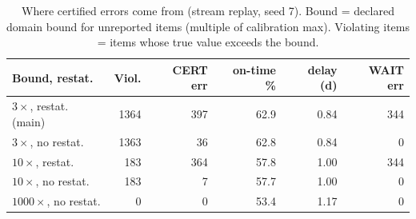 \begin{table}[t]\centering\caption{Where certified errors come from (stream replay, seed 7). Bound = declared domain bound for unreported items (multiple of calibration max). Violating items = items whose true value exceeds the bound.}\label{tab:sound}
\scriptsize\setlength{\tabcolsep}{2pt}\begin{tabular}{lrrrrr}\toprule
Bound, restat. & Viol. & CERT err & on-time \% & delay (d) & WAIT err\\
\midrule
$3\times$, restat. (main) & 1364 & 397 & 62.9 & 0.84 & 344\\
$3\times$, no restat. & 1363 & 36 & 62.8 & 0.84 & 0\\
$10\times$, restat. & 183 & 364 & 57.8 & 1.00 & 344\\
$10\times$, no restat. & 183 & 7 & 57.7 & 1.00 & 0\\
$1000\times$, no restat. & 0 & 0 & 53.4 & 1.17 & 0\\
\bottomrule\end{tabular}\end{table}
